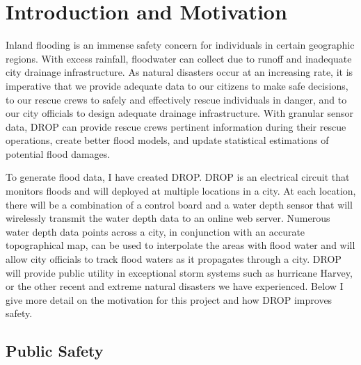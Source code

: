 \documentclass[letter]{article}
\begin{document}
\pagebreak

\tableofcontents

\pagebreak
\section{Introduction and Motivation}
\label{sec:introduction}

Inland flooding is an immense safety concern for individuals in certain geographic regions. With excess rainfall, floodwater can collect due to runoff and inadequate city drainage infrastructure. As natural disasters occur at an increasing rate, it is imperative that we provide adequate data to our citizens to make safe decisions, to our rescue crews to safely and effectively rescue individuals in danger, and to our city officials to design adequate drainage infrastructure. With granular sensor data, DROP can provide rescue crews pertinent information during their rescue operations, create better flood models, and update statistical estimations of potential flood damages.

To generate flood data, I have created DROP. DROP is an electrical circuit that monitors floods and will deployed at multiple locations in a city. At each location, there will be a combination of a control board and a water depth sensor that will wirelessly transmit the water depth data to an online web server. Numerous water depth data points across a city, in conjunction with an accurate topographical map, can be used to interpolate the areas with flood water and will allow city officials to track flood waters as it propagates through a city. DROP will provide public utility in exceptional storm systems such as hurricane Harvey, or the other recent and extreme natural disasters we have experienced. Below I give more detail on the motivation for this project and how DROP improves safety. 
\subsection{Public Safety}
\end{document}
